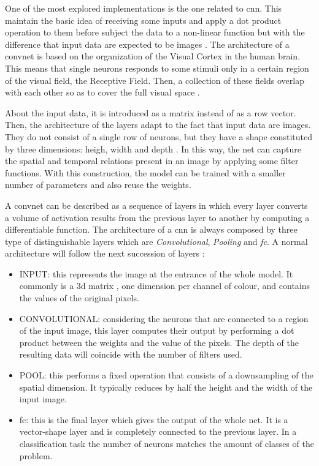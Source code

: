 
\label{section:cnn}

	One of the most explored implementations is the one related to \acrfull{cnn}. This maintain the basic idea of receiving some inputs and apply a dot product operation to them before subject the data to a non-linear function but with the difference that input data are expected to be images \cite{Karpathy2016}. The architecture of a \acrlong{convnet} is based on the organization of the Visual Cortex in the human brain. This means that single neurons responds to some stimuli only in a certain region of the visual field, the Receptive Field. Then, a collection of these fields overlap with each other so as to cover the full visual space \cite{Saha2018}.
	
	About the input data, it is introduced as a matrix instead of as a row vector. Then, the architecture of the layers adapt to the fact that input data are images. They do not consist of a single row of neurons, but they have a shape constituted by three dimensions: heigh, width and depth \cite{Karpathy2016} . In this way, the net can capture the spatial and temporal relations present in an image by applying some filter functions. With this construction, the model can be trained with a smaller number of parameters and also reuse the weights.
	
	A \acrlong{convnet} can be described as a sequence of layers in which every layer converts a volume of activation results from the previous layer to another by computing a differentiable function. The architecture of a \acrshort{cnn} is always composed by three type of distinguishable layers which are \textit{Convolutional}, \textit{Pooling} and \textit{\acrlong{fc}}. A normal architecture will follow the next succession of layers \cite{Karpathy2016}:
	
	\begin{itemize}
		\item INPUT: this represents the image at the entrance of the whole model. It commonly is a 3\acrshort{d} matrix , one dimension per channel of colour, and contains the values of the original pixels.
		\item CONVOLUTIONAL: considering the neurons that are connected to a region of the input image, this layer computes their output by performing a dot product between the weights and the value of the pixels. The depth of the resulting data will coincide with the number of filters used.
		\item POOL: this performs a fixed operation that consists of a downsampling of the spatial dimension. It typically reduces by half the height and the width of the input image.
		\item \acrshort{fc}: this is the final layer which gives the output of the whole net. It is a vector-shape layer and is completely connected to the previous layer. In a classification task the number of neurons matches the amount of classes of the problem.
	\end{itemize}
	
